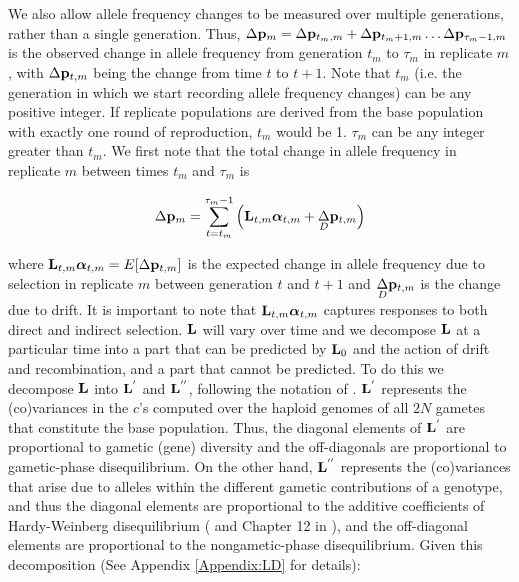 \documentclass[12pt]{article}
\begin{document}
\begin{bibunit}
We also allow allele frequency changes to be measured over multiple generations, rather than a single generation. Thus, $\Delta {\bf p}_m = \Delta {\bf p}_{t_m,m}+\Delta {\bf p}_{t_m+1,m}\dots\Delta {\bf p}_{\tau_m-1,m}$ is the observed change in allele frequency from generation $t_m$ to $\tau_m$ in replicate $m$, with $\Delta {\bf p}_{t,m}$ being the change from time $t$ to $t+1$. Note that $t_m$ (i.e. the generation in which we start recording allele frequency changes) can be any positive integer. If replicate populations are derived from the base population with exactly one round of reproduction, $t_m$ would be 1. $\tau_m$ can be any integer greater than $t_m$. We first note that the total change in allele frequency in replicate $m$ between times $t_m$ and $\tau_m$ is

\begin{equation}
\Delta {\bf p}_{m} = \sum^{\tau_m-1}_{t=t_m}\left({\bf L}_{t,m}\boldsymbol{\alpha}_{t,m}+\underset{D}\Delta {\bf p}_{t,m}\right)
\end{equation}

where ${\bf L}_{t,m}\boldsymbol{\alpha}_{t,m}=E[\Delta{\bf p}_{t,m}]$ is the expected change in allele frequency due to selection in replicate $m$ between generation $t$ and $t+1$ and $\underset{D}\Delta {\bf p}_{t,m}$ is the change due to drift. It is important to note that ${\bf L}_{t,m}\boldsymbol{\alpha}_{t,m}$ captures responses to both direct and indirect selection. ${\bf L}$ will vary over time and we decompose ${\bf L}$ at a particular time into a part that can be predicted by ${\bf L}_0$ and the action of drift and recombination, and a part that cannot be predicted. To do this we decompose  ${\bf L}$ into ${\bf L}^{'}$ and ${\bf L}^{''}$, following the notation of \citet{buffalo2019linked}. ${\bf L}^{'}$ represents the (co)variances in the $c$'s computed over the haploid genomes of all $2N$ gametes that constitute the base population. Thus, the diagonal elements of ${\bf L}^{'}$ are proportional to gametic (gene) diversity and the off-diagonals are proportional to gametic-phase disequilibrium. On the other hand, ${\bf L}^{''}$  represents the (co)variances that arise due to alleles within the different gametic contributions of a genotype, and thus the diagonal elements are proportional to the additive coefficients of Hardy-Weinberg disequilibrium (\citet{bulmer1980mathematical} and Chapter 12 in \citet{Weir.1989}), and the off-diagonal elements are proportional to the nongametic-phase disequilibrium. Given this decomposition (See Appendix \ref{Appendix:LD} for details):


\end{bibunit}
\end{document}
